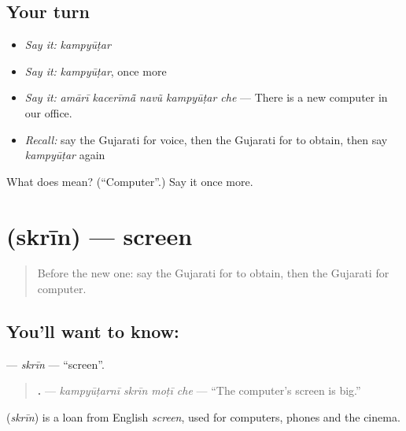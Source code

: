 \subsection*{Your turn}
\begin{itemize}
\raggedright
  \item \emph{Say it:} \emph{kampyūṭar}
  \item \emph{Say it:} \emph{kampyūṭar}, once more
  \item \emph{Say it:} \emph{amārī kacerīmā̃ navũ kampyūṭar che} — There is a new computer in our office.
  \item \emph{Recall:} say the Gujarati for voice, then the Gujarati for to obtain, then say \emph{kampyūṭar} again
\end{itemize}

\begin{tcolorbox}[breakable,colback=teal!4,colframe=teal!35!black,title={Before you move on}]
What does  mean? (\textquotedblleft{}Computer\textquotedblright{}.) Say it once more.
\end{tcolorbox}
\section[\texorpdfstring{\gu{સ્ક્રીન} (skrīn)}{સ્ક્રીન (skrīn)}]{ (skrīn) — screen}

\label{lesson:GU-C250-skrin}



\begin{quote}
Before the new one: say the Gujarati for to obtain, then the Gujarati for computer.
\end{quote}

\subsection*{You'll want to know: }
\textbf{} — \emph{skrīn} — \textquotedblleft{}screen\textquotedblright{}.

\begin{quote}
\textbf{   .} — \emph{kampyūṭarnī skrīn moṭī che} — \textquotedblleft{}The computer's screen is big.\textquotedblright{}
\end{quote}

\begin{cousinweb}
\textbf{} (\emph{skrīn}) is a loan from English \emph{screen}, used for computers, phones and the cinema.
\end{cousinweb}

